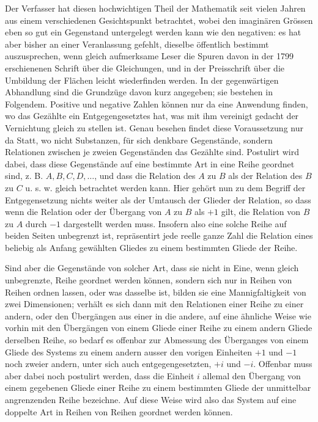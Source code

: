 \documentclass[12pt]{article}
\begin{document}
Der Verfasser hat diesen hochwichtigen Theil der Mathematik seit vielen Jahren aus einem verschiedenen Gesichtspunkt betrachtet, wobei den imaginären Grössen eben so gut ein Gegenstand untergelegt werden kann wie den negativen: es hat aber bisher an einer Veranlassung gefehlt, dieselbe öffentlich bestimmt auszusprechen, wenn gleich aufmerksame Leser die Spuren davon in der 1799 erschienenen Schrift über die Gleichungen, und in der Preisschrift über die Umbildung der Flächen leicht wiederfinden werden. In der gegenwärtigen Abhandlung sind die Grundzüge davon kurz angegeben; sie bestehen in Folgendem. Positive und negative Zahlen können nur da eine Anwendung finden, wo das Gezählte ein Entgegengesetztes hat, was mit ihm vereinigt gedacht der Vernichtung gleich zu stellen ist. Genau besehen findet diese Voraussetzung nur da Statt, wo nicht Substanzen, für sich denkbare Gegenstände, sondern Relationen zwischen je zweien Gegenständen das Gezählte sind. Postulirt wird dabei, dass diese Gegenstände auf eine bestimmte Art in eine Reihe geordnet sind, z. B. $A,B,C,D,\ldots$, und dass die Relation des $A$ zu $B$ als der Relation des $B$ zu $C$ u. s. w. gleich betrachtet werden kann. Hier gehört nun zu dem Begriff der Entgegensetzung nichts weiter als der Umtausch der Glieder der Relation, so dass wenn die Relation oder der Übergang von $A$ zu $B$ als $+1$ gilt, die Relation von $B$ zu $A$ durch $-1$ dargestellt werden muss. Insofern also eine solche Reihe auf beiden Seiten unbegrenzt ist, repräsentirt jede reelle ganze Zahl die Relation eines beliebig als Anfang gewählten Gliedes zu einem bestimmten Gliede der Reihe.

Sind aber die Gegenstände von solcher Art, dass sie nicht in Eine, wenn gleich unbegrenzte, Reihe geordnet werden können, sondern sich nur in Reihen von Reihen ordnen lassen, oder was dasselbe ist, bilden sie eine Mannigfaltigkeit von zwei Dimensionen; verhält es sich dann mit den Relationen einer Reihe zu einer andern, oder den Übergängen aus einer in die andere, auf eine ähnliche Weise wie vorhin mit den Übergängen von einem Gliede einer Reihe zu einem andern Gliede derselben Reihe, so bedarf es offenbar zur Abmessung des Überganges von einem Gliede des Systems zu einem andern ausser den vorigen Einheiten $+1$ und $-1$ noch zweier andern, unter sich auch entgegengesetzten, $+i$ und $-i$. Offenbar muss aber dabei noch postulirt werden, dass die Einheit $i$ allemal den Übergang von einem gegebenen Gliede einer Reihe zu einem bestimmten Gliede der unmittelbar angrenzenden Reihe bezeichne. Auf diese Weise wird also das System auf eine doppelte Art in Reihen von Reihen geordnet werden können.
\end{document}
